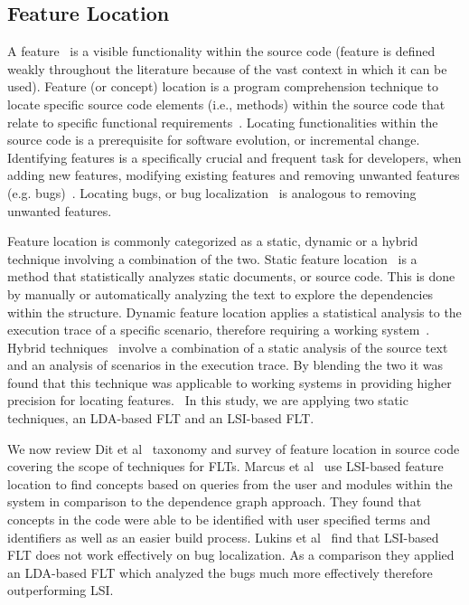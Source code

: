 \subsection{Feature Location}

A feature~\cite{Biggerstaff-etal:1993} is a visible functionality within the source code
(feature is defined weakly throughout the literature because of the vast
context in which it can be used). Feature (or concept) location is a program
comprehension technique to locate specific source code elements (i.e., methods)
within the source code that relate to specific functional
requirements~\cite{Eisenbarth-etal:2001, Biggers-etal:2014}. Locating functionalities
within the source code is a prerequisite for software evolution, or incremental
change.  Identifying features is a specifically crucial and frequent task for
developers, when adding new features, modifying existing features and removing
unwanted features (e.g.  bugs)~\cite{Rajlich-Gosavi:2004, Dit-etal:2013b}. Locating bugs,
or bug localization~\cite{Lukins-etal:2008, Bassett-Kraft:2013} is analogous to removing unwanted features.

Feature location is commonly categorized as a static, dynamic or a hybrid
technique involving a combination of the two. Static feature
location~\cite{Biggers-etal:2014} is a method that statistically analyzes
static documents, or source code. This is done by manually or automatically
analyzing the text to explore the dependencies within the structure. Dynamic
feature location applies a statistical analysis to the execution trace of a
specific scenario, therefore requiring a working system~\cite{Eisenbarth-etal:2001,Poshyvanyk-etal:2007}.
Hybrid techniques~\cite{Eisenbarth-etal:2003} involve a combination of a static analysis of
the source text and an analysis of scenarios in the execution trace. By
blending the two it was found that this technique was applicable to working
systems in providing higher precision for locating features.~\cite{Poshyvanyk-etal:2007,
Ernst:2004, Revelle-Coppitt:UNK} In this study, we are applying two static
techniques, an LDA-based FLT and an LSI-based FLT.

We now review Dit et al~\cite{Dit-etal:2013b} taxonomy and survey of feature
location in source code covering the scope of techniques for FLTs.  Marcus et
al~\cite{Marcus-etal:2004} use LSI-based feature location to find concepts based on
queries from the user and modules within the system in comparison to the
dependence graph approach. They found that concepts in the code were able to be
identified with user specified terms and identifiers as well as an easier build
process. Lukins et al~\cite{Lukins-etal:2008} find that LSI-based FLT does
not work effectively on bug localization. As a comparison they applied an
LDA-based FLT which analyzed the bugs much more effectively therefore
outperforming LSI.

